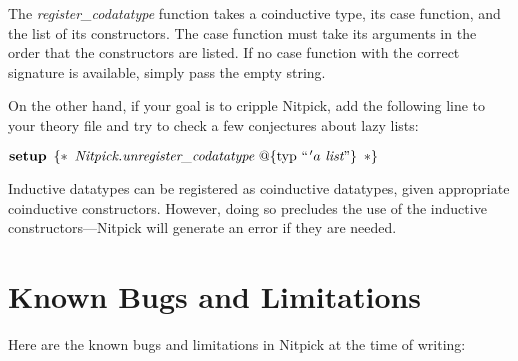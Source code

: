 \documentclass[a4paper,12pt]{article}
\begin{document}
The \textit{register\_codatatype} function takes a coinductive type, its case
function, and the list of its constructors. The case function must take its
arguments in the order that the constructors are listed. If no case function
with the correct signature is available, simply pass the empty string.

On the other hand, if your goal is to cripple Nitpick, add the following line to
your theory file and try to check a few conjectures about lazy lists:

\prew
$\textbf{setup}~\,\{{*}\,~\textit{Nitpick.unregister\_codatatype}~@\{\textrm{typ}~``
\kern1pt'a~\textit{list}\textrm{''}\}\ \,{*}\}$
\postw

Inductive datatypes can be registered as coinductive datatypes, given
appropriate coinductive constructors. However, doing so precludes
the use of the inductive constructors---Nitpick will generate an error if they
are needed.

\section{Known Bugs and Limitations}
\label{known-bugs-and-limitations}

Here are the known bugs and limitations in Nitpick at the time of writing:
\end{document}

